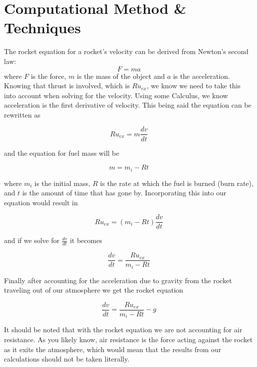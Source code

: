 \documentclass[11pt]{article}
\begin{document}
\section{Computational Method \& Techniques}
The rocket equation for a rocket's velocity can be derived from Newton's second law:
\begin{equation}
F = ma
\end{equation}
where $F$ is the force, $m$ is the mass of the object and $a$ is the acceleration.
Knowing that thrust is involved, which is $Ru_{ex}$, we know we need to take this into account when solving for the velocity. Using some Calculus, we know acceleration is the first derivative of velocity. This being said the equation can be rewritten as

\begin{equation}
Ru_{ex} = m \frac{dv}{dt}
\end{equation}

\noindent and the equation for fuel mass will be 

\begin{equation}
m = m_i - Rt
\end{equation}

\noindent where $m_i$ is the initial mass, $R$ is the rate at which the fuel is burned (burn rate), and $t$ is the amount of time that has gone by. Incorporating this into our equation would result in

\begin{equation}
Ru_{ex} = (m_i - Rt) \frac{dv}{dt}
\end{equation}

\noindent and if we solve for $\frac{dv}{dt}$ it becomes

\begin{equation}
\frac{dv}{dt} = \frac{Ru_{ex}}{m_i - Rt}
\end{equation} 

Finally after accounting for the acceleration due to gravity from the rocket traveling out of our atmosphere we get the rocket equation

\begin{equation}\label{eq:rocketeq}
\frac{dv}{dt} = \frac{Ru_{ex}}{m_i-Rt}-g
\end{equation}

It should be noted that with the rocket equation we are not accounting for air resistance. As you likely know, air resistance is the force acting against the rocket as it exits the atmosphere, which would mean that the results from our calculations should not be taken literally.
\end{document}
